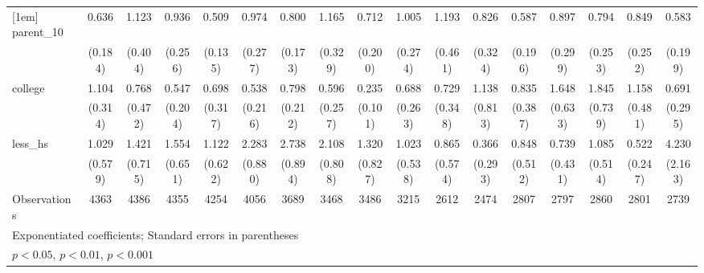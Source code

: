{\begin{tabular}{l*{16}{c}}
[1em]
parent\_10           &       0.636         &       1.123         &       0.936         &       0.509\sym{*}  &       0.974         &       0.800         &       1.165         &       0.712         &       1.005         &       1.193         &       0.826         &       0.587         &       0.897         &       0.794         &       0.849         &       0.583         \\
                    &     (0.184)         &     (0.404)         &     (0.256)         &     (0.135)         &     (0.277)         &     (0.173)         &     (0.329)         &     (0.200)         &     (0.274)         &     (0.461)         &     (0.324)         &     (0.196)         &     (0.299)         &     (0.253)         &     (0.252)         &     (0.199)         \\
[1em]
college             &       1.104         &       0.768         &       0.547         &       0.698         &       0.538         &       0.798         &       0.596         &       0.235\sym{***}&       0.688         &       0.729         &       1.138         &       0.835         &       1.648         &       1.845         &       1.158         &       0.691         \\
                    &     (0.314)         &     (0.472)         &     (0.204)         &     (0.317)         &     (0.216)         &     (0.212)         &     (0.257)         &     (0.101)         &     (0.263)         &     (0.348)         &     (0.813)         &     (0.387)         &     (0.633)         &     (0.739)         &     (0.481)         &     (0.295)         \\
[1em]
less\_hs             &       1.029         &       1.421         &       1.554         &       1.122         &       2.283\sym{*}  &       2.738\sym{**} &       2.108         &       1.320         &       1.023         &       0.865         &       0.366         &       0.848         &       0.739         &       1.085         &       0.522         &       4.230\sym{**} \\
                    &     (0.579)         &     (0.715)         &     (0.651)         &     (0.622)         &     (0.880)         &     (0.894)         &     (0.808)         &     (0.827)         &     (0.538)         &     (0.574)         &     (0.293)         &     (0.512)         &     (0.431)         &     (0.514)         &     (0.247)         &     (2.163)         \\
\hline
Observations        &        4363         &        4386         &        4355         &        4254         &        4056         &        3689         &        3468         &        3486         &        3215         &        2612         &        2474         &        2807         &        2797         &        2860         &        2801         &        2739         \\
\hline\hline
\multicolumn{17}{l}{\footnotesize Exponentiated coefficients; Standard errors in parentheses}\\
\multicolumn{17}{l}{\footnotesize \sym{*} \(p<0.05\), \sym{**} \(p<0.01\), \sym{***} \(p<0.001\)}\\
\end{tabular}
}
